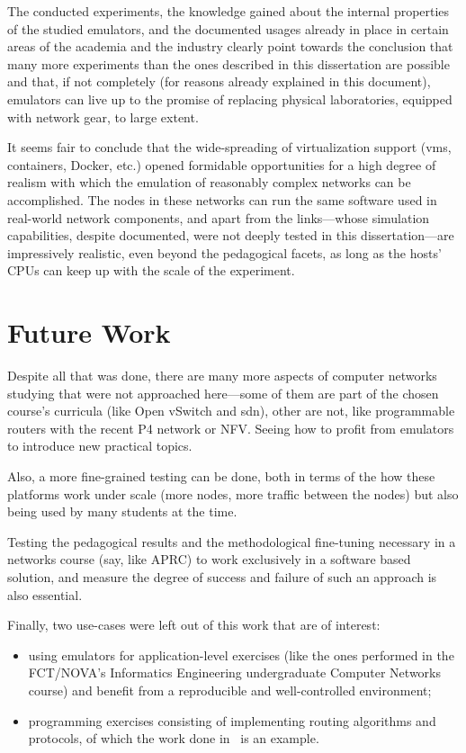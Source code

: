 The conducted experiments, the knowledge gained about the internal properties of the studied emulators, and the documented usages already in place in certain areas of the academia and the industry clearly point towards the conclusion that many more experiments than the ones described in this dissertation are possible and that, if not completely (for reasons already explained in this document), emulators can live up to the promise of replacing physical laboratories, equipped with network gear, to large extent.

It seems fair to conclude that the wide-spreading of virtualization support (\glspl{vm}, containers, Docker, etc.) opened formidable opportunities for a high degree of realism with which the emulation of reasonably complex networks can be accomplished.
The nodes in these networks can run the same software used in real-world network components, and apart from the links---whose simulation capabilities, despite documented, were not deeply tested in this dissertation---are impressively realistic, even beyond the pedagogical facets, as long as the hosts' CPUs can keep up with the scale of the experiment.

\section{Future Work}

Despite all that was done, there are many more aspects of computer networks studying that were not approached here---some of them are part of the chosen course's curricula (like Open vSwitch and \gls{sdn}), other are not, like programmable routers with the recent P4 network or NFV.
Seeing how to profit from emulators to introduce new practical topics.

Also, a more fine-grained testing can be done, both in terms of the how these platforms work under scale (more nodes, more traffic between the nodes) but also being used by many students at the time.

Testing the pedagogical results and the methodological fine-tuning necessary in a networks course (say, like APRC) to work exclusively in a software based solution, and measure the degree of success and failure of such an approach is also essential.

Finally, two use-cases were left out of this work that are of interest:
\begin{itemize}
  \item using emulators for application-level exercises (like the ones performed in the FCT/NOVA's Informatics Engineering undergraduate Computer Networks course) and benefit from a reproducible and well-controlled environment;
  \item programming exercises consisting of implementing routing algorithms and protocols, of which the work done in~\cite{teachandlearnmininet} is an example.
\end{itemize}

